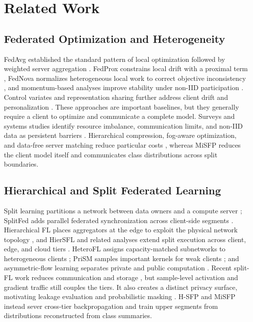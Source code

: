 \section{Related Work}\label{sec:related}
\subsection{Federated Optimization and Heterogeneity}
FedAvg established the standard pattern of local optimization followed by weighted server aggregation \cite{pmlr-v54-mcmahan17a}. FedProx constrains local drift with a proximal term \cite{li2020federated}, FedNova normalizes heterogeneous local work to correct objective inconsistency \cite{10.5555/3495724.3496362}, and momentum-based analyses improve stability under non-IID participation \cite{cheng2024momentumbenefits,zaccone2025communication}. Control variates and representation sharing further address client drift and personalization \cite{pmlr-v119-karimireddy20a,collins2021exploiting}. These approaches are important baselines, but they generally require a client to optimize and communicate a complete model. Surveys and systems studies identify resource imbalance, communication limits, and non-IID data as persistent barriers \cite{MAL-083,9084352,11180918}. Hierarchical compression, fog-aware optimization, and data-free server matching reduce particular costs \cite{nguyen2022hcfl,9760729,nguyen2025federated}, whereas MiSFP reduces the client model itself and communicates class distributions across split boundaries.

\subsection{Hierarchical and Split Federated Learning}
Split learning partitions a network between data owners and a compute server \cite{GUPTA20181,vepakomma2019split}; SplitFed adds parallel federated synchronization across client-side segments \cite{thapa2022splitfed}. Hierarchical FL places aggregators at the edge to exploit the physical network topology \cite{9148862,9488756,rana2022hierarchical}, and HierSFL and related analyses extend split execution across client, edge, and cloud tiers \cite{quan2023hiersfl,10980018}. HeteroFL assigns capacity-matched subnetworks to heterogeneous clients \cite{diao2021heterofl}; PriSM samples important kernels for weak clients \cite{niu2023overcoming}; and asymmetric-flow learning separates private and public computation \cite{10655220}. Recent split-FL work reduces communication and storage \cite{11091500,zhang2025amperecommunicationefficienthighaccuracysplit}, but sample-level activation and gradient traffic still couples the tiers. It also creates a distinct privacy surface, motivating leakage evaluation and probabilistic masking \cite{qiu2023evaluating,wang2025towards}. H-SFP and MiSFP instead sever cross-tier backpropagation and train upper segments from distributions reconstructed from class summaries.

